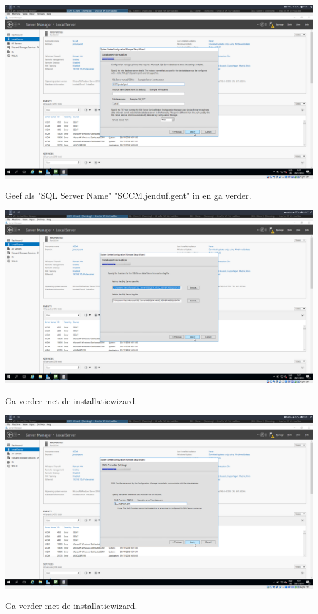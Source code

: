 \documentclass[a4paper]{article}
\begin{document}
\begin{center}
\includegraphics[width=15cm]{Pictures/SCCM/6/1543504659.png}

Geef als "SQL Server Name" "SCCM.jenduf.gent" in en ga verder.
\end{center}
\begin{center}
\includegraphics[width=15cm]{Pictures/SCCM/6/1543504663.png}

Ga verder met de installatiewizard.
\end{center}
\begin{center}
\includegraphics[width=15cm]{Pictures/SCCM/6/1543504665.png}

Ga verder met de installatiewizard.
\end{center}
\end{document}
